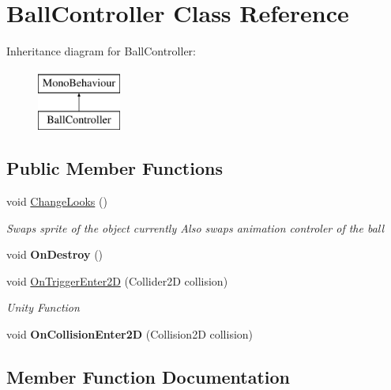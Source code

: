 \hypertarget{class_ball_controller}{}\section{Ball\+Controller Class Reference}
\label{class_ball_controller}
Inheritance diagram for Ball\+Controller\+:\begin{figure}[H]
\begin{center}
\leavevmode
\includegraphics[height=2.000000cm]{class_ball_controller}
\end{center}
\end{figure}
\subsection*{Public Member Functions}
\begin{DoxyCompactItemize}
\item 
void \hyperlink{class_ball_controller_acb6de308cee7675f3732a48a82c6e39d}{Change\+Looks} ()
\begin{DoxyCompactList}\small\item\em Swaps sprite of the object currently Also swaps animation controler of the ball \end{DoxyCompactList}\item 
void {\bfseries On\+Destroy} ()\hypertarget{class_ball_controller_ad35c0b5aaf8fa8159b0d5c9e76f8ed11}{}\label{class_ball_controller_ad35c0b5aaf8fa8159b0d5c9e76f8ed11}

\item 
void \hyperlink{class_ball_controller_acec4d88fdeba4ef3dbd8d5c35782801f}{On\+Trigger\+Enter2D} (Collider2D collision)
\begin{DoxyCompactList}\small\item\em Unity Function \end{DoxyCompactList}\item 
void {\bfseries On\+Collision\+Enter2D} (Collision2D collision)\hypertarget{class_ball_controller_ab2fd3c261b304252ac9e39f831cf1198}{}\label{class_ball_controller_ab2fd3c261b304252ac9e39f831cf1198}

\end{DoxyCompactItemize}


\subsection{Member Function Documentation}
